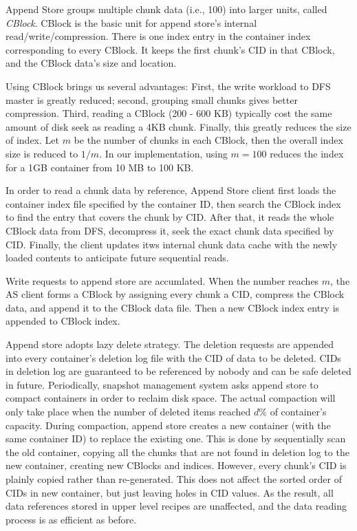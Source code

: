 Append Store groups multiple chunk data (i.e., 100) into larger units, called {\em CBlock}.
CBlock is the basic unit for append store's internal read/write/compression.
There is one index entry in the container index corresponding to every CBlock. It keeps the first chunk's CID
in that CBlock, and the CBlock data's size and location.

Using CBlock brings us several advantages: First, the write workload to DFS master is greatly reduced; second, grouping
small chunks gives better compression. Third, reading a CBlock (200 - 600 KB) typically cost the same amount of disk 
seek as reading a 4KB chunk. Finally, this greatly reduces the size of index. Let $m$ be the number of chunks in each
CBlock, then the overall index size is reduced to $1/m$. In our implementation, using $m=100$ reduces the index for
a 1GB container from 10 MB to 100 KB.

In order to read a chunk data by reference, Append Store client first loads the
container index file specified by the container ID, then search the CBlock index to find the entry that covers the chunk by CID.
After that, it reads the whole CBlock data from DFS, decompress it, seek the exact chunk data specified by CID. 
Finally, the client updates itws internal chunk data cache with the newly loaded contents to anticipate future sequential reads.

Write requests to append store are accumlated. When the number reaches $m$, the AS client forms a CBlock by assigning 
every chunk a CID, compress the CBlock data, and append it to the CBlock data file. Then a new CBlock index entry is appended
to CBlock index.

Append store adopts lazy delete strategy. The deletion requests are appended into every container's deletion log file with the CID of data to be deleted.
CIDs in deletion log are guaranteed to be referenced by nobody and can be safe deleted in future. 
Periodically, snapshot management system asks append store to compact containers in order to reclaim disk space. 
The actual compaction will only take place when the number of deleted items reached $d\%$ of container's capacity. 
During compaction, append store creates a new container (with the same container ID) to replace the 
existing one. This is done by sequentially scan the old container, copying all the chunks that are not 
found in deletion log to the new container, creating new CBlocks and indices. 
However, every chunk's CID is plainly copied rather than re-generated. This does not affect the sorted
order of CIDs in new container, but just leaving holes in CID values. As the result, all data references stored 
in upper level recipes are unaffected, and the data reading process is as efficient as before.

